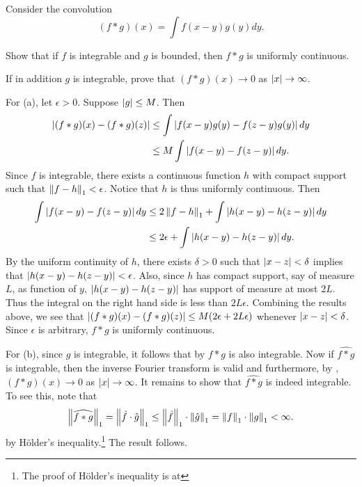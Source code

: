 \begin{exercise}
    Consider the convolution 
    \begin{equation*}
        (f*g)(x) = \int f(x-y)g(y)dy.
    \end{equation*}
    \begin{thmenum}
        \item Show that if $f$ is integrable and $g$ is bounded, then $f*g$ is uniformly 
        continuous.
        \item If in addition $g$ is integrable, prove that $(f*g)(x)\to 0$ as $\left\lvert {x} \right\rvert\to\infty$. 
    \end{thmenum}
\end{exercise}
\begin{pf}
    For (a), let $\epsilon>0$. Suppose $\left\lvert {g} \right\rvert\leq M$. Then 
    \begin{equation*}
        \begin{split}
            \left\lvert {(f*g)(x)-(f*g)(z)} \right\rvert &\leq \int \left\lvert {f(x-y)g(y)-f(z-y)g(y)} \right\rvert dy \\ 
            &\leq M\int \left\lvert {f(x-y)-f(z-y)} \right\rvert dy.
        \end{split}
    \end{equation*}
    Since $f$ is integrable, there exists a continuous function $h$ with compact 
    support such that $\left\lVert {f-h} \right\rVert_1<\epsilon$. Notice that $h$ is thus uniformly 
    continuous. Then  
    \begin{equation*}
        \begin{split}
            \int \left\lvert {f(x-y)-f(z-y)} \right\rvert dy &\leq 2\left\lVert {f-h} \right\rVert_1 + \int \left\lvert {h(x-y)-h(z-y)} \right\rvert dy \\
            &\leq 2\epsilon + \int \left\lvert {h(x-y)-h(z-y)} \right\rvert dy.
        \end{split}
    \end{equation*}
    By the uniform continuity of $h$, there exists $\delta>0$ such that 
    $\left\lvert {x-z} \right\rvert<\delta$ implies that $\left\lvert {h(x-y)-h(z-y)} \right\rvert<\epsilon$. Also, 
    since $h$ has compact support, say of measure $L$, as function of $y$, 
    $\left\lvert {h(x-y)-h(z-y)} \right\rvert$ has support of measure at most $2L$. Thus the 
    integral on the right hand side is less than $2L\epsilon$. Combining 
    the results above, we see that $\left\lvert {(f*g)(x)-(f*g)(z)} \right\rvert
    \leq M(2\epsilon + 2L\epsilon)$ whenever $\left\lvert {x-z} \right\rvert<\delta$. Since 
    $\epsilon$ is arbitrary, $f*g$ is uniformly continuous.

    For (b), since $g$ is integrable, it follows that by  $f*g$ is 
    also integrable. Now if $\widehat{f*g}$ is integrable, then the inverse 
    Fourier transform is valid and furthermore, by , $(f*g)(x)\to 0$ 
    as $\left\lvert {x} \right\rvert\to\infty$. It remains to show that $\widehat{f*g}$ is indeed 
    integrable. To see this, note that 
    \begin{equation*}
        \left\lVert {\widehat{f*g}} \right\rVert_1 = \left\lVert {\hat{f}\cdot\hat{g}} \right\rVert_1 \leq \left\lVert {\hat{f}} \right\rVert_1\cdot\left\lVert {\hat{g}} \right\rVert_1 = \left\lVert {f} \right\rVert_1\cdot\left\lVert {g} \right\rVert_1 < \infty.
    \end{equation*}
    by H\"older's inequality.\footnote{The proof of H\"older's inequality is at 
    } The result follows.
\end{pf}

